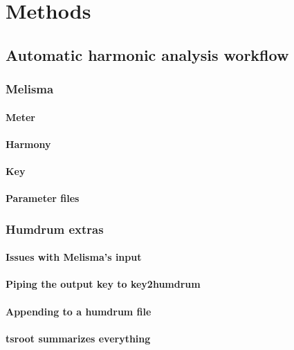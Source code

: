 \normallinespacing

\chapter{Methods}

\section{Automatic harmonic analysis workflow}
  \subsection{Melisma}
  	\subsubsection{Meter}
    \subsubsection{Harmony}
    \subsubsection{Key}
    \subsubsection{Parameter files}
  \subsection{Humdrum extras}
   	\subsubsection{Issues with Melisma's input}
    \subsubsection{Piping the output key to key2humdrum}
\pagebreak
    \subsubsection{Appending to a humdrum file}
    \subsubsection{tsroot summarizes everything}
